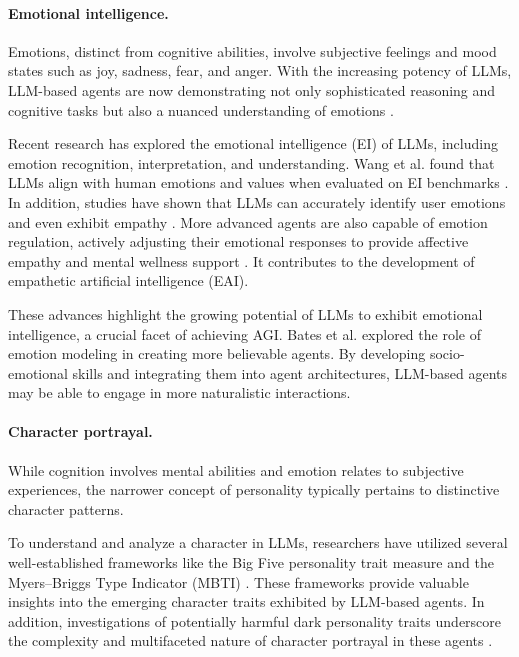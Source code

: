 \paragraph{Emotional intelligence.}
Emotions, distinct from cognitive abilities, involve subjective feelings and mood states such as joy, sadness, fear, and anger.
With the increasing potency of LLMs, LLM-based agents are now demonstrating not only sophisticated reasoning and cognitive tasks but also a nuanced understanding of emotions \cite{DBLP:journals/corr/abs-2303-12712}.

Recent research has explored the emotional intelligence (EI) of LLMs, including emotion recognition, interpretation, and understanding. Wang et al. found that LLMs align with human emotions and values when evaluated on EI benchmarks \cite{DBLP:journals/corr/abs-2307-09042}.
In addition, studies have shown that LLMs can accurately identify user emotions and even exhibit empathy \cite{DBLP:conf/acl/CurryC23, elyoseph2023chatgpt}.
More advanced agents are also capable of emotion regulation, actively adjusting their emotional responses to provide affective empathy \cite{DBLP:journals/corr/abs-2308-03022} and mental wellness support \cite{DBLP:journals/corr/abs-2302-09070, DBLP:journals/corr/abs-2307-15810}. It contributes to the development of empathetic artificial intelligence (EAI).

These advances highlight the growing potential of LLMs to exhibit emotional intelligence, a crucial facet of achieving AGI. Bates et al. \cite{DBLP:journals/cacm/Bates94} explored the role of emotion modeling in creating more believable agents. 
By developing socio-emotional skills and integrating them into agent architectures, LLM-based agents may be able to engage in more naturalistic interactions.

\paragraph{Character portrayal.}
While cognition involves mental abilities and emotion relates to subjective experiences, the narrower concept of personality typically pertains to distinctive character patterns.

To understand and analyze a character in LLMs, researchers have utilized several well-established frameworks like the Big Five personality trait measure \cite{DBLP:journals/corr/abs-2212-10276, DBLP:journals/corr/abs-2204-12000} and the Myers–Briggs Type Indicator (MBTI) \cite{DBLP:journals/corr/abs-2212-10276, DBLP:journals/corr/abs-2307-16180, DBLP:journals/corr/abs-2204-12000}. These frameworks provide valuable insights into the emerging character traits exhibited by LLM-based agents. In addition,  investigations of potentially harmful dark personality traits underscore the complexity and multifaceted nature of character portrayal in these agents \cite{li2023does}.


